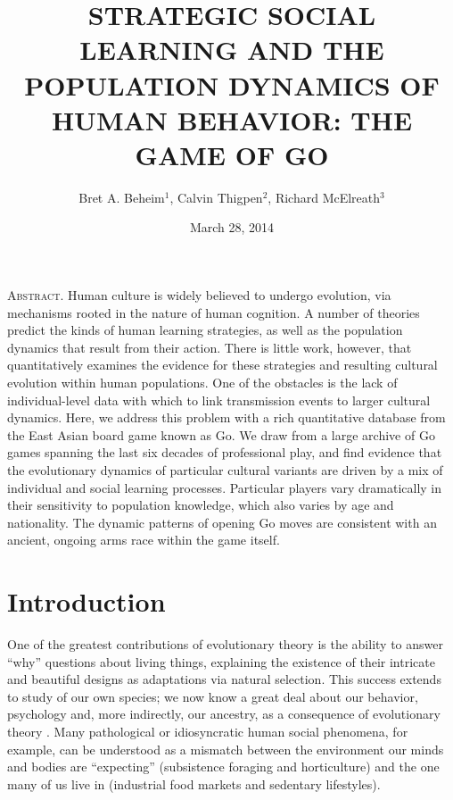 \documentclass[reqno,12pt]{amsart}
\title[STRATEGIC SOCIAL LEARNING]
{\large STRATEGIC SOCIAL LEARNING AND THE POPULATION DYNAMICS OF HUMAN BEHAVIOR:
THE GAME OF GO}
\author{Bret A. Beheim\(^1\), Calvin Thigpen\(^2\), Richard McElreath\(^3\)}
\date{March 28, 2014}
\begin{document}




\linenumbers
\modulolinenumbers[5]

\maketitle

\noindent\textsc{Abstract.}
Human culture is widely believed to undergo evolution, via mechanisms
rooted in the nature of human cognition. A number of theories predict
the kinds of human learning strategies, as well as the population
dynamics that result from their action. There is little work, however,
that quantitatively examines the evidence for these strategies and
resulting cultural evolution within human populations. One of the
obstacles is the lack of individual-level data with which to link
transmission events to larger cultural dynamics. Here, we address this
problem with a rich quantitative database from the East Asian board game
known as Go. We draw from a large archive of Go games spanning the last
six decades of professional play, and find evidence that the
evolutionary dynamics of particular cultural variants are driven by a
mix of individual and social learning processes. Particular players vary
dramatically in their sensitivity to population knowledge, which also
varies by age and nationality. The dynamic patterns of opening Go moves
are consistent with an ancient, ongoing arms race within the game
itself.
 
\vspace{12pt}

\vspace{24pt}

\section{Introduction}\label{introduction}

One of the greatest contributions of evolutionary theory is the ability
to answer ``why'' questions about living things, explaining the
existence of their intricate and beautiful designs as adaptations via
natural selection. This success extends to study of our own species; we
now know a great deal about our behavior, psychology and, more
indirectly, our ancestry, as a consequence of evolutionary theory
\citep{Barkow1992adaptedmind, LalandBrown2002sense}. Many pathological
or idiosyncratic human social phenomena, for example, can be understood
as a mismatch between the environment our minds and bodies are
``expecting'' (subsistence foraging and horticulture) and the one many
of us live in (industrial food markets and sedentary lifestyles).
\end{document}
